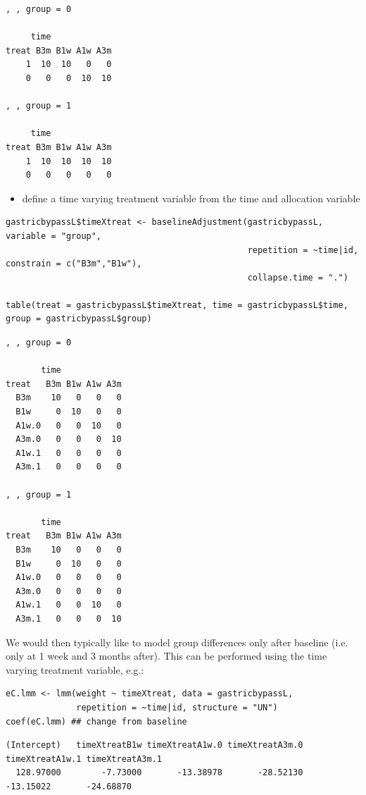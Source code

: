 \documentclass[12pt]{article}
\begin{document}
\begin{verbatim}
, , group = 0

     time
treat B3m B1w A1w A3m
    1  10  10   0   0
    0   0   0  10  10

, , group = 1

     time
treat B3m B1w A1w A3m
    1  10  10  10  10
    0   0   0   0   0
\end{verbatim}

\begin{itemize}
\item define a time varying treatment variable from the time and allocation variable
\end{itemize}
\lstset{language=r,label= ,caption= ,captionpos=b,numbers=none}
\begin{lstlisting}
gastricbypassL$timeXtreat <- baselineAdjustment(gastricbypassL, variable = "group",
                                                repetition = ~time|id, constrain = c("B3m","B1w"),
                                                collapse.time = ".")

table(treat = gastricbypassL$timeXtreat, time = gastricbypassL$time, group = gastricbypassL$group)
\end{lstlisting}

\begin{verbatim}
, , group = 0

       time
treat   B3m B1w A1w A3m
  B3m    10   0   0   0
  B1w     0  10   0   0
  A1w.0   0   0  10   0
  A3m.0   0   0   0  10
  A1w.1   0   0   0   0
  A3m.1   0   0   0   0

, , group = 1

       time
treat   B3m B1w A1w A3m
  B3m    10   0   0   0
  B1w     0  10   0   0
  A1w.0   0   0   0   0
  A3m.0   0   0   0   0
  A1w.1   0   0  10   0
  A3m.1   0   0   0  10
\end{verbatim}

We would then typically like to model group differences only after
baseline (i.e. only at 1 week and 3 months after). This can be
performed using the time varying treatment variable, e.g.:
\lstset{language=r,label= ,caption= ,captionpos=b,numbers=none}
\begin{lstlisting}
eC.lmm <- lmm(weight ~ timeXtreat, data = gastricbypassL,
              repetition = ~time|id, structure = "UN")
coef(eC.lmm) ## change from baseline
\end{lstlisting}

\begin{verbatim}
(Intercept)   timeXtreatB1w timeXtreatA1w.0 timeXtreatA3m.0 timeXtreatA1w.1 timeXtreatA3m.1 
  128.97000        -7.73000       -13.38978       -28.52130       -13.15022       -24.68870
\end{verbatim}
\end{document}
